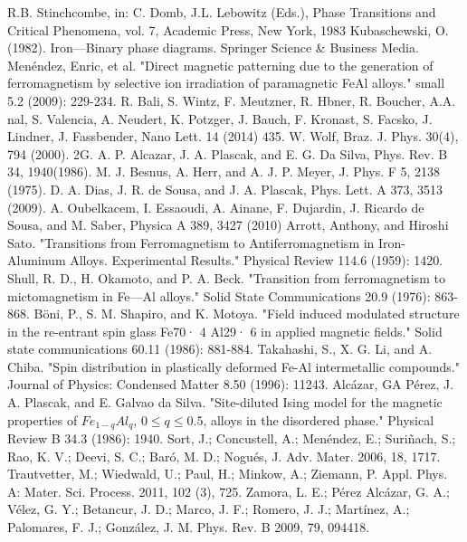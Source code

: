 \documentclass[twocolumn,5p,12pt]{elsarticle}
\begin{document}
\begin{thebibliography}{00}

 R.B. Stinchcombe, in: C. Domb, J.L. Lebowitz (Eds.), Phase Transitions and Critical Phenomena, vol. 7, Academic Press, New York, 1983
 Kubaschewski, O. (1982). Iron—Binary phase diagrams. Springer Science \& Business Media.
 Menéndez, Enric, et al. "Direct magnetic patterning due to the generation of ferromagnetism by selective ion irradiation of paramagnetic FeAl alloys." small 5.2 (2009): 229-234.
 R. Bali, S. Wintz, F. Meutzner, R. Hbner, R. Boucher, A.A. nal, S. Valencia, A. Neudert, K. Potzger, J. Bauch, F. Kronast, S. Facsko, J. Lindner, J. Fassbender, Nano Lett. 14 (2014) 435.
 W. Wolf, Braz. J. Phys. 30(4), 794 (2000). 2G. A. P. Alcazar, J. A. Plascak, and E. G. Da Silva, Phys. Rev. B 34, 1940(1986).
 M. J. Besnus, A. Herr, and A. J. P. Meyer, J. Phys. F 5, 2138 (1975).
 D. A. Dias, J. R. de Sousa, and J. A. Plascak, Phys. Lett. A 373, 3513 (2009).
 A. Oubelkacem, I. Essaoudi, A. Ainane, F. Dujardin, J. Ricardo de Sousa, and M. Saber, Physica A 389, 3427 (2010)
 Arrott, Anthony, and Hiroshi Sato. "Transitions from Ferromagnetism to Antiferromagnetism in Iron-Aluminum Alloys. Experimental Results." Physical Review 114.6 (1959): 1420.
 Shull, R. D., H. Okamoto, and P. A. Beck. "Transition from ferromagnetism to mictomagnetism in Fe—Al alloys." Solid State Communications 20.9 (1976): 863-868.
 Böni, P., S. M. Shapiro, and K. Motoya. "Field induced modulated structure in the re-entrant spin glass Fe70· 4 Al29· 6 in applied magnetic fields." Solid state communications 60.11 (1986): 881-884.
 Takahashi, S., X. G. Li, and A. Chiba. "Spin distribution in plastically deformed Fe-Al intermetallic compounds." Journal of Physics: Condensed Matter 8.50 (1996): 11243.
 Alcázar, GA Pérez, J. A. Plascak, and E. Galvao da Silva. "Site-diluted Ising model for the magnetic properties of $Fe_{1− q}Al_q$, $0≤ q≤ 0.5$, alloys in the disordered phase." Physical Review B 34.3 (1986): 1940.
 Sort, J.; Concustell, A.; Menéndez, E.; Suriñach, S.; Rao, K. V.; Deevi, S. C.; Baró, M. D.; Nogués, J. Adv. Mater. 2006, 18, 1717.
 Trautvetter, M.; Wiedwald, U.; Paul, H.; Minkow, A.; Ziemann, P. Appl. Phys. A: Mater. Sci. Process. 2011, 102 (3), 725.
 Zamora, L. E.; Pérez Alcázar, G. A.; Vélez, G. Y.; Betancur, J. D.; Marco, J. F.; Romero, J. J.; Martínez, A.; Palomares, F. J.; González, J. M. Phys. Rev. B 2009, 79, 094418.

\end{thebibliography}
\end{document}
